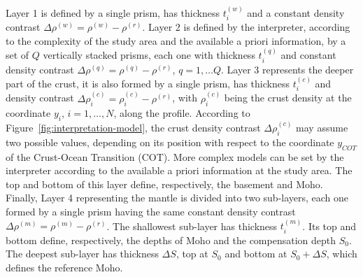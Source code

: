 \documentclass[manuscript]{geophysics}
\begin{document}
Layer 1 is defined by a single prism, has thickness $t^{(w)}_{i}$ and a constant density
contrast $\Delta \rho^{(w)} = \rho^{(w)} - \rho^{(r)}$.
Layer 2 is defined by the interpreter, according to the complexity of the study area 
and the available a priori information, by a set of $Q$ vertically stacked
prisms, each one with thickness $t^{(q)}_{i}$ and constant density contrast
$\Delta \rho^{(q)} = \rho^{(q)} - \rho^{(r)}$, $q = 1, \dots Q$.
Layer 3 represents the deeper part of the crust, it is also formed by a single prism,
has thickness $t^{(c)}_{i}$ and density contrast 
$\Delta \rho^{(c)}_{i} = \rho^{(c)}_{i} - \rho^{(r)}$, 
with $\rho^{(c)}_{i}$ being the crust density at the coordinate
$y_{i}$, $i = 1, \dots, N$, along the profile.
According to Figure~\ref{fig:interpretation-model}, the crust density contrast
$\Delta \rho^{(c)}_{i}$ may assume two possible values, depending on its position
with respect to the coordinate $y_{COT}$ of the Crust-Ocean Transition (COT).
More complex models can be set by the interpreter according to the available
a priori information at the study area.
The top and bottom of this layer define, respectively, the basement and Moho. 
Finally, Layer 4 representing the mantle is divided into two sub-layers, each one formed
by a single prism having the same constant density contrast 
$\Delta \rho^{(m)} = \rho^{(m)} - \rho^{(r)}$. The shallowest sub-layer 
has thickness $t^{(m)}_{i}$. Its top and bottom define,
respectively, the depths of Moho and the compensation depth $S_{0}$.
The deepest sub-layer has thickness $\Delta S$, top at $S_{0}$ and bottom at 
$S_{0} + \Delta S$, which defines the reference Moho. 
\end{document}
